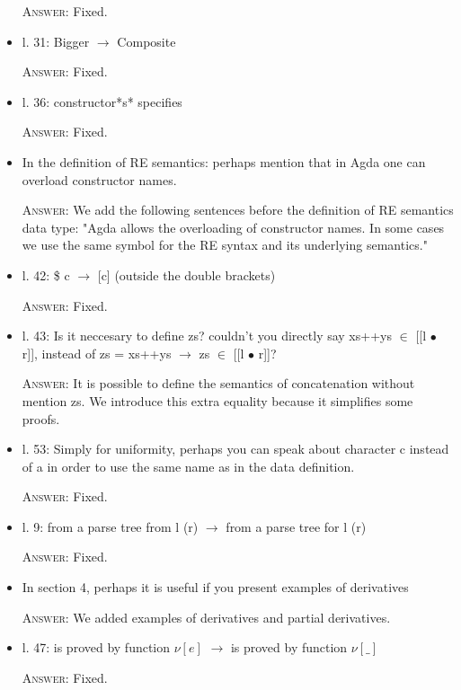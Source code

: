\documentclass{article}
\begin{document}
\begin{itemize}
    \textsc{Answer}: Fixed.

    \item l. 31: Bigger $\to$ Composite

    \textsc{Answer}: Fixed.

    \item l. 36: constructor*s* specifies

    \textsc{Answer}: Fixed.

    \item In the definition of RE semantics:
    perhaps  mention that in Agda one can overload constructor names. 

    \textsc{Answer}: We add the following sentences before the definition of RE semantics data type:
    "Agda allows the overloading of constructor names. In some cases we use the same symbol for 
    the RE syntax and its underlying semantics."

    \item l. 42: \$ c $\to$ [c] (outside the double brackets)

    \textsc{Answer}: Fixed.

    \item l. 43: Is it neccesary to define zs? couldn't you directly say xs++ys $\in$ [[l $\bullet$ r]], instead of zs = xs++ys $\to$ zs $\in$ [[l $\bullet$ r]]?

    \textsc{Answer}: It is possible to define the semantics of concatenation without mention zs. We introduce this extra equality because it simplifies
    some proofs.  

    \item l. 53: Simply for uniformity, perhaps you can speak about character c instead of a in order to use the same name as in the data definition.

    \textsc{Answer}: Fixed.

    \item l. 9: from a parse tree from l (r) $\to$ from a parse tree for l (r)

    \textsc{Answer}: Fixed.

    \item In section 4, perhaps it is useful if you present examples of derivatives

    \textsc{Answer}: We added examples of derivatives and partial derivatives.

    \item l. 47: is proved by function $\nu[e]$ $\to$ is proved by function $\nu[\_]$

    \textsc{Answer}: Fixed.


\end{itemize}
\end{document}
